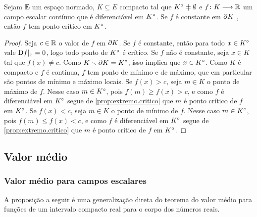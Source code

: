 \begin{proposition}
\label{prop:compacto.critico}
Sejam $\bm E$ um espaço normado, $K \subseteq E$ compacto tal que $\Int{K} \neq \emptyset$ e $f\colon \allowbreak K \longrightarrow \mathbb{R}$ um campo escalar contínuo que é diferenciável em ${K}^\circ$. Se $f$ é constante em $\partial{K}$%
, então $f$ tem ponto crítico em ${K}^\circ$.
\end{proposition}
\begin{proof}
Seja $c \in \mathbb{R}$ o valor de $f$ em $\partial{K}$. Se $f$ é constante, então para todo $x \in {K}^\circ$ vale $\mathrm{D} f|_x = 0$, logo todo ponto de ${K}^\circ$ é crítico. Se $f$ não é constante, seja $x \in K$ tal que $f(x) \neq c$. Como $K \smallsetminus \partial{K} = {K}^\circ$, isso implica que $x \in {K}^\circ$. Como $K$ é compacto e $f$ é contínua, $f$ tem ponto de mínimo e de máximo, que em particular são pontos de mínimo e máximo locais. Se $f(x) > c$, seja $m \in K$ o ponto de máximo de $f$. Nesse caso $m \in {K}^\circ$, pois $f(m) \geq f(x) > c$, e como $f$ é diferenciável em ${K}^\circ$ segue de \ref{prop:extremo.critico} que $m$ é ponto crítico de $f$ em ${K}^\circ$. Se $f(x) < c$, seja $m \in K$ o ponto de mínimo de $f$. Nesse caso $m \in {K}^\circ$, pois $f(m) \leq f(x) < c$, e como $f$ é diferenciável em ${K}^\circ$ segue de \ref{prop:extremo.critico} que $m$ é ponto crítico de $f$ em ${K}^\circ$.
\end{proof}

\subsection{Valor médio}

\subsubsection{Valor médio para campos escalares}

A proposição a seguir é uma generalização direta do teorema do valor médio para funções de um intervalo compacto real para o corpo dos números reais.

